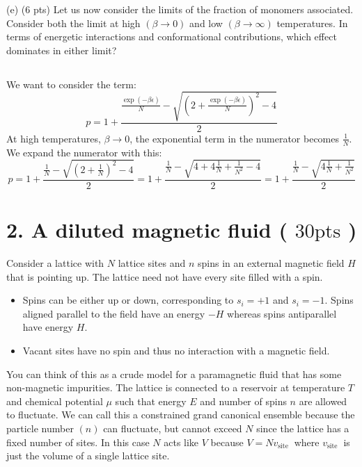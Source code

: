 \documentclass[10pt]{article}
\begin{document}
(e) (6 pts) Let us now consider the limits of the fraction of monomers associated. Consider both the limit at high $(\beta \rightarrow 0)$ and low $(\beta \rightarrow \infty)$ temperatures. In terms of energetic interactions and conformational contributions, which effect dominates in either limit?
\subsection{}
We want to consider the term:
\begin{equation}
  p=1+\frac{\frac{\exp (-\beta \epsilon)}{N}-\sqrt{\left(2+\frac{\exp (-\beta \epsilon)}{N}\right)^{2}-4}}{2}
\end{equation}
At high temperatures, $\beta \rightarrow 0$, the exponential term in the numerator becomes $\frac{1}{N}$. We expand the numerator with this:
\begin{equation}
  p=1+\frac{\frac{1}{N}-\sqrt{\left(2+\frac{1}{N}\right)^{2}-4}}{2} = 1+\frac{\frac{1}{N}-\sqrt{4+4\frac{1}{N}+\frac{1}{N^2}-4}}{2} = 1+\frac{\frac{1}{N}-\sqrt{4\frac{1}{N}+\frac{1}{N^2}}}{2}
\end{equation}


\section*{2. A diluted magnetic fluid ( $30 \mathrm{pts}$ )}
Consider a lattice with $N$ lattice sites and $n$ spins in an external magnetic field $H$ that is pointing up. The lattice need not have every site filled with a spin.

\begin{itemize}
  \item Spins can be either up or down, corresponding to $s_{i}=+1$ and $s_{i}=-1$. Spins aligned parallel to the field have an energy $-H$ whereas spins antiparallel have energy $H$.
  \item Vacant sites have no spin and thus no interaction with a magnetic field.
\end{itemize}

You can think of this as a crude model for a paramagnetic fluid that has some non-magnetic impurities. The lattice is connected to a reservoir at temperature $T$ and chemical potential $\mu$ such that energy $E$ and number of spins $n$ are allowed to fluctuate. We can call this a constrained grand canonical ensemble because the particle number $(n)$ can fluctuate, but cannot exceed $N$ since the lattice has a fixed number of sites. In this case $N$ acts like $V$ because $V=N v_{\text {site }}$ where $v_{\text {site }}$ is just the volume of a single lattice site.
\end{document}
